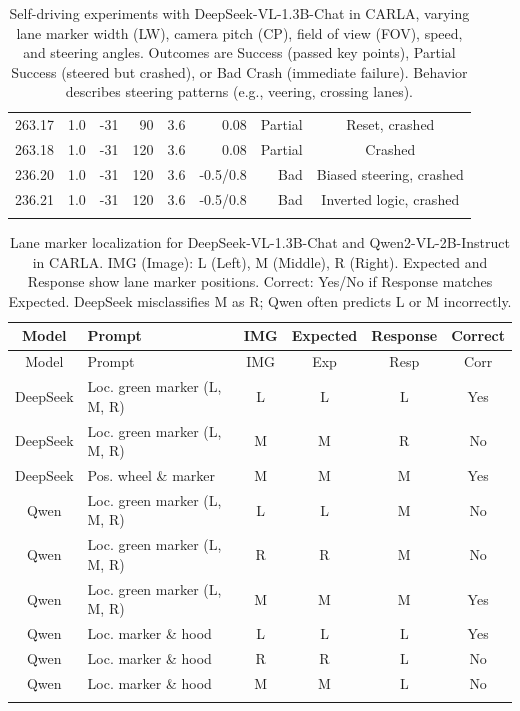 \begin{longtable}{@{}clrrrrrc@{}}
263.17 & 1.0 & -31 & 90 & 3.6 & 0.08 & Partial & Reset, crashed \\
263.18 & 1.0 & -31 & 120 & 3.6 & 0.08 & Partial & Crashed \\
236.20 & 1.0 & -31 & 120 & 3.6 & -0.5/0.8 & Bad & Biased steering, crashed \\
236.21 & 1.0 & -31 & 120 & 3.6 & -0.5/0.8 & Bad & Inverted logic, crashed \\
\bottomrule
\caption{Self-driving experiments with DeepSeek-VL-1.3B-Chat in CARLA, varying lane marker width (LW), camera pitch (CP), field of view (FOV), speed, and steering angles. Outcomes are Success (passed key points), Partial Success (steered but crashed), or Bad Crash (immediate failure). Behavior describes steering patterns (e.g., veering, crossing lanes).}
\label{tab:deepseek_self_driving}
\end{longtable}

\begin{longtable}{@{}clcccc@{}}
\toprule
Model & Prompt & IMG & Expected & Response & Correct \\
\midrule
\endfirsthead
\toprule
Model & Prompt & IMG & Exp & Resp & Corr \\
\midrule
\endhead
DeepSeek & Loc. green marker (L, M, R) & L & L & L & Yes \\
DeepSeek & Loc. green marker (L, M, R) & M & M & R & No \\
DeepSeek & Pos. wheel \& marker & M & M & M & Yes \\
Qwen & Loc. green marker (L, M, R) & L & L & M & No \\
Qwen & Loc. green marker (L, M, R) & R & R & M & No \\
Qwen & Loc. green marker (L, M, R) & M & M & M & Yes \\
Qwen & Loc. marker \& hood & L & L & L & Yes \\
Qwen & Loc. marker \& hood & R & R & L & No \\
Qwen & Loc. marker \& hood & M & M & L & No \\
\bottomrule
\caption{Lane marker localization for DeepSeek-VL-1.3B-Chat and Qwen2-VL-2B-Instruct in CARLA. IMG (Image): L (Left), M (Middle), R (Right). Expected and Response show lane marker positions. Correct: Yes/No if Response matches Expected. DeepSeek misclassifies M as R; Qwen often predicts L or M incorrectly.}
\label{tab:prompt_responses}
\end{longtable}

